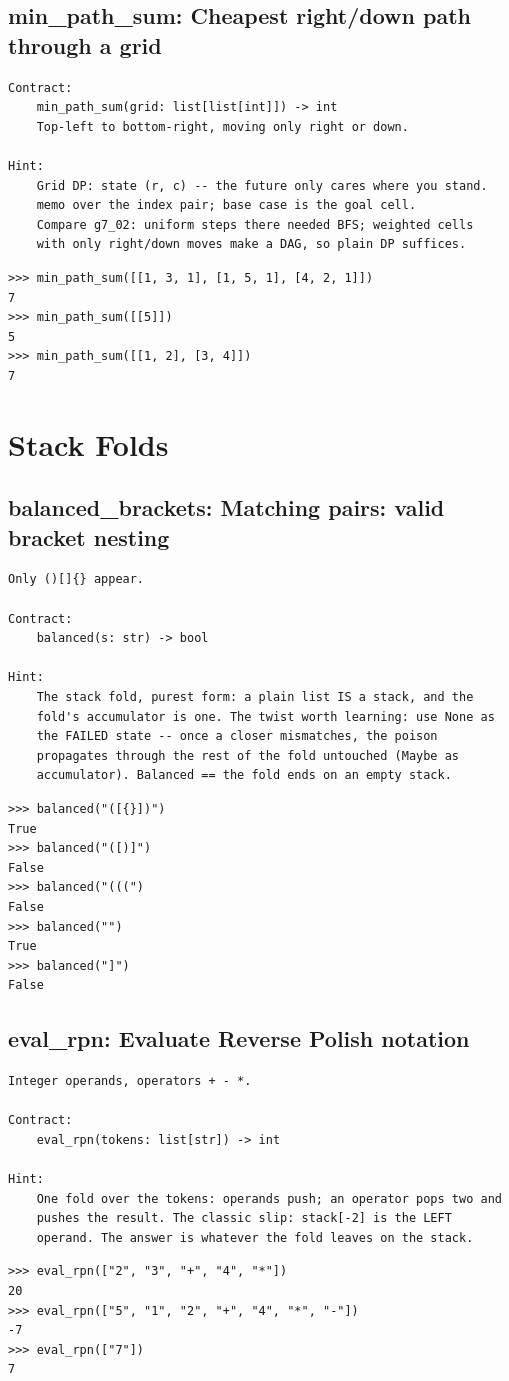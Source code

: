 \documentclass[10pt,letterpaper]{book}
\begin{document}
\section{min\_path\_sum: Cheapest right/down path through a grid}
\begin{lstlisting}[style=ex]
Contract:
    min_path_sum(grid: list[list[int]]) -> int
    Top-left to bottom-right, moving only right or down.

Hint:
    Grid DP: state (r, c) -- the future only cares where you stand.
    memo over the index pair; base case is the goal cell.
    Compare g7_02: uniform steps there needed BFS; weighted cells
    with only right/down moves make a DAG, so plain DP suffices.
\end{lstlisting}
\begin{lstlisting}[style=ex]
>>> min_path_sum([[1, 3, 1], [1, 5, 1], [4, 2, 1]])
7
>>> min_path_sum([[5]])
5
>>> min_path_sum([[1, 2], [3, 4]])
7
\end{lstlisting}
\chapter{Stack Folds}

\section{balanced\_brackets: Matching pairs: valid bracket nesting}
\begin{lstlisting}[style=ex]
Only ()[]{} appear.

Contract:
    balanced(s: str) -> bool

Hint:
    The stack fold, purest form: a plain list IS a stack, and the
    fold's accumulator is one. The twist worth learning: use None as
    the FAILED state -- once a closer mismatches, the poison
    propagates through the rest of the fold untouched (Maybe as
    accumulator). Balanced == the fold ends on an empty stack.
\end{lstlisting}
\begin{lstlisting}[style=ex]
>>> balanced("([{}])")
True
>>> balanced("([)]")
False
>>> balanced("(((")
False
>>> balanced("")
True
>>> balanced("]")
False
\end{lstlisting}

\section{eval\_rpn: Evaluate Reverse Polish notation}
\begin{lstlisting}[style=ex]
Integer operands, operators + - *.

Contract:
    eval_rpn(tokens: list[str]) -> int

Hint:
    One fold over the tokens: operands push; an operator pops two and
    pushes the result. The classic slip: stack[-2] is the LEFT
    operand. The answer is whatever the fold leaves on the stack.
\end{lstlisting}
\begin{lstlisting}[style=ex]
>>> eval_rpn(["2", "3", "+", "4", "*"])
20
>>> eval_rpn(["5", "1", "2", "+", "4", "*", "-"])
-7
>>> eval_rpn(["7"])
7
\end{lstlisting}
\end{document}
